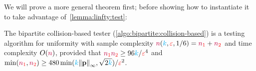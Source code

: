 We will prove a more general theorem first; before showing how to instantiate it to take advantage of~\cref{lemma:linfty:test}:
\begin{theorem}
  \label{theo:bipartite:collision-based:general}
The bipartite collision-based tester (\cref{algo:bipartite:collision-based}) is a testing algorithm for uniformity with sample complexity $\ns(\ab,\dst,1/6) = \nss+\nst$ and time complexity $O(\ns)$, provided that $\nss\nst \geq 96\ab/\dst^4$ and $\min(\nss,\nst)\geq 480\min(\ab\norminf{\p}, \sqrt{2\ab})/\dst^2$.
\end{theorem}
